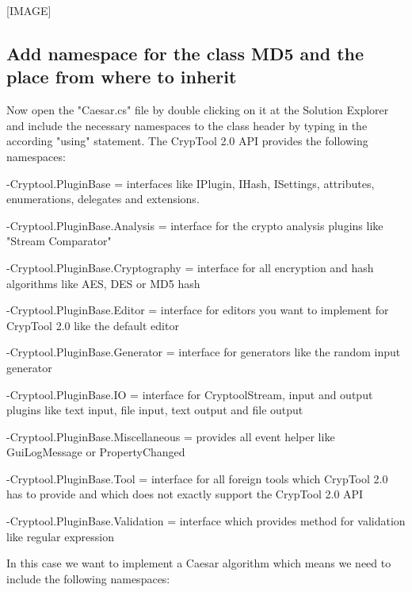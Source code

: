 [IMAGE]
\subsection{Add namespace for the class MD5 and the place from where to inherit}
\label{sec:AddNamespaceForTheClassMD5AndThePlaceFromWhereToInherit}
Now open the "Caesar.cs" file by double clicking on it at the Solution Explorer and include the necessary namespaces to the class header by typing in the according "using" statement. The CrypTool 2.0 API provides the following namespaces:

\hspace{20pt}-Cryptool.PluginBase = interfaces like IPlugin, IHash, ISettings, attributes, enumerations, delegates and extensions.

\hspace{20pt}-Cryptool.PluginBase.Analysis = interface for the crypto analysis plugins like "Stream Comparator"

\hspace{20pt}-Cryptool.PluginBase.Cryptography = interface for all encryption and hash algorithms like AES, DES or MD5 hash

\hspace{20pt}-Cryptool.PluginBase.Editor = interface for editors you want to implement for CrypTool 2.0 like the default editor

\hspace{20pt}-Cryptool.PluginBase.Generator = interface for generators like the random input generator

\hspace{20pt}-Cryptool.PluginBase.IO = interface for CryptoolStream, input and output plugins like text input, file input, text output and file output

\hspace{20pt}-Cryptool.PluginBase.Miscellaneous = provides all event helper like GuiLogMessage or PropertyChanged

\hspace{20pt}-Cryptool.PluginBase.Tool = interface for all foreign tools which CrypTool 2.0 has to provide and which does not exactly support the CrypTool 2.0 API

\hspace{20pt}-Cryptool.PluginBase.Validation = interface which provides method for validation like regular expression

In this case we want to implement a Caesar algorithm which means we need to include the following namespaces:

